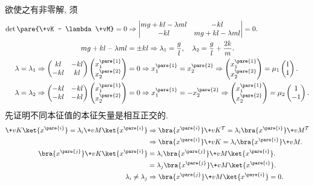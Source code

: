 \documentclass[../LectureNotes.tex]{subfiles}
\begin{document}
欲使之有非零解, 须
\begin{align*}
    \det \pare{\+vK - \lambda \+vM} = 0 &\Rightarrow \begin{vmatrix}
    mg + kl - \lambda ml & -kl \\
    -kl & mg + kl - \lambda ml
    \end{vmatrix} = 0. \\
    mg + kl - \lambda ml &= \pm kl \Rightarrow \lambda_1 = \frac{g}{l},\quad \lambda_2 = \frac{g}{l} + \frac{2k}{m}. \\
    \lambda = \lambda_1 \Rightarrow \begin{pmatrix}
        kl & -kl \\ -kl & kl
    \end{pmatrix} \begin{pmatrix}
        x_1^{\pare{1}} \\ x_2^{\pare{2}}
    \end{pmatrix} &= 0 \Rightarrow x_1^{\pare{1}} = x_2^{\pare{2}} \Rightarrow \begin{pmatrix}
        x_1^{\pare{1}} \\ x_2^{\pare{2}}
    \end{pmatrix} = \mu_1 \begin{pmatrix}
        1 \\ 1
    \end{pmatrix}. \\
    \lambda = \lambda_2 \Rightarrow \begin{pmatrix}
        -kl & -kl \\ -kl & -kl
    \end{pmatrix} \begin{pmatrix}
        x_1^{\pare{1}} \\ x_2^{\pare{2}}
    \end{pmatrix} &= 0 \Rightarrow x_1^{\pare{1}} = -x_2^{\pare{2}} \Rightarrow \begin{pmatrix}
        x_1^{\pare{1}} \\ x_2^{\pare{2}}
    \end{pmatrix} = \mu_2 \begin{pmatrix}
        1 \\ -1
    \end{pmatrix}.
\end{align*}
先证明不同本征值的本征矢量是相互正交的.
\begin{align*}
    \+vK \ket{x^{\pare{i}}} = \lambda_i \+vM \ket{x^{\pare{i}}} &\Rightarrow \bra{x^{\pare{i}}} \+vK^T = \lambda_i \bra{x^{\pare{i}}} \+vM^T\\ &\Rightarrow \bra{x^{\pare{i}}} \+vK = \lambda_i \bra{x^{\pare{i}}} \+vM. \\
    \bra{x^{\pare{j}}} \+vK \ket{x^{\pare{i}}} &= \lambda_i \bra{x^{\pare{j}}} \+vM \ket{x^{\pare{i}}}. \\
    &= \lambda_j \bra{x^{\pare{j}}} \+vM \ket{x^{\pare{i}}}. \\
    \lambda_i \neq \lambda_j &\Rightarrow \bra{x^{\pare{j}}} \+vM \ket{x^{\pare{i}}} = 0.
\end{align*}
\end{document}
